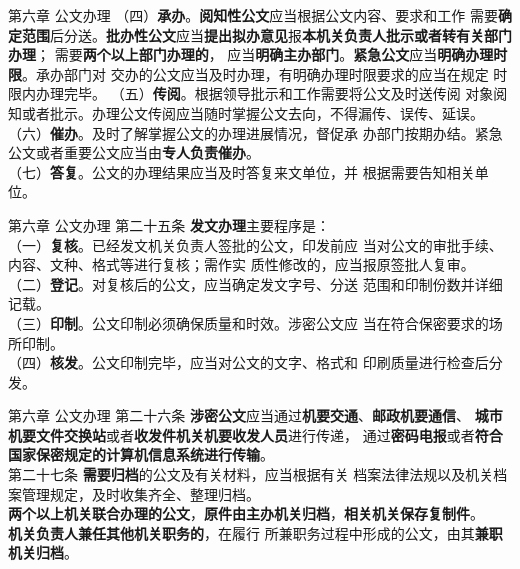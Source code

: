 \documentclass[aspectratio=169]{beamer}
\begin{document}
\begin{frame}[t]{第六章 公文办理} \vspace{20pt}
    （四）\textbf{承办}。\textbf{阅知性公文}应当根据公文内容、要求和工作
    需要\textbf{确定范围}后分送。\textbf{批办性公文}应当\textbf{提出拟办意见}报\textbf{本机关负责人批示或者转有关部门办理}；
    需要\textbf{两个以上部门办理的}，
    应当\textbf{明确主办部门}。\textbf{紧急公文}应当\textbf{明确办理时限}。承办部门对
    交办的公文应当及时办理，有明确办理时限要求的应当在规定
    时限内办理完毕。
    （五）\textbf{传阅}。根据领导批示和工作需要将公文及时送传阅
    对象阅知或者批示。办理公文传阅应当随时掌握公文去向，不得漏传、误传、延误。\\
    （六）\textbf{催办}。及时了解掌握公文的办理进展情况，督促承
    办部门按期办结。紧急公文或者重要公文应当由\textbf{专人负责催办}。\\
    （七）\textbf{答复}。公文的办理结果应当及时答复来文单位，并
    根据需要告知相关单位。\\
\end{frame}



\begin{frame}[t]{第六章 公文办理} \vspace{20pt}
    第二十五条 \textbf{发文办理}主要程序是：\\
    （一）\textbf{复核}。已经发文机关负责人签批的公文，印发前应
    当对公文的审批手续、内容、文种、格式等进行复核；需作实
    质性修改的，应当报原签批人复审。\\
    （二）\textbf{登记}。对复核后的公文，应当确定发文字号、分送
    范围和印制份数并详细记载。\\
    （三）\textbf{印制}。公文印制必须确保质量和时效。涉密公文应
    当在符合保密要求的场所印制。\\
    （四）\textbf{核发}。公文印制完毕，应当对公文的文字、格式和
    印刷质量进行检查后分发。\\
\end{frame}




\begin{frame}[t]{第六章 公文办理} \vspace{20pt}
    第二十六条 \textbf{涉密公文}应当通过\textbf{机要交通}、\textbf{邮政机要通信}、
    \textbf{城市机要文件交换站}或者\textbf{收发件机关机要收发人员}进行传递，
    通过\textbf{密码电报}或者\textbf{符合国家保密规定的计算机信息系统进行传输}。\\
    第二十七条 \textbf{需要归档}的公文及有关材料，应当根据有关
    档案法律法规以及机关档案管理规定，及时收集齐全、整理归档。\\
    \textbf{两个以上机关联合办理的公文}，\textbf{原件由主办机关归档}，\textbf{相关机关保存复制件}。\\
    \textbf{机关负责人兼任其他机关职务的}，在履行
    所兼职务过程中形成的公文，由其\textbf{兼职机关归档}。\\
\end{frame}
\end{document}
